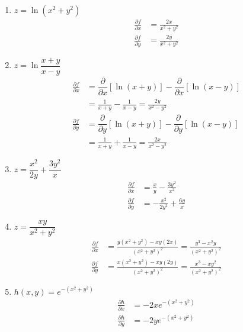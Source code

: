 \begin{enumerate}
    \item $z=\ln \left(x^2+y^2\right)$
          \sol{}
          \begin{align*}
              \frac{\partial f}{\partial x} & = \frac{2x}{x^2+y^2} \\ \frac{\partial f}{\partial y} &= \frac{2y}{x^2+y^2}
          \end{align*}

    \item $z=\ln \dfrac{x+y}{x-y}$
          \sol{}
          \begin{align*}
              \frac{\partial f}{\partial x} & = \dfrac{\partial}{\partial x}[\ln (x + y)] - \dfrac{\partial}{\partial x}[\ln (x - y)] \\  & = \frac{1}{x+y} - \frac{1}{x-y} = \frac{2y}{x^2-y^2}
              \\ \frac{\partial f}{\partial y} & = \dfrac{\partial}{\partial y}[\ln (x + y)] - \dfrac{\partial}{\partial y}[\ln (x - y)] \\ & = \frac{1}{x+y} + \frac{1}{x-y} = \frac{2x}{x^2-y^2}
          \end{align*}
    \item $z=\dfrac{x^2}{2 y}+\dfrac{3 y^2}{x}$
          \sol{}
          \begin{align*}
              \frac{\partial f}{\partial x} & = \frac{x}{y} - \frac{3y^2}{x^2} \\ \frac{\partial f}{\partial y} &= -\frac{x^2}{2y^2} + \frac{6y}{x}
          \end{align*}
    \item $z=\dfrac{x y}{x^2+y^2}$
          \sol{}
          \begin{align*}
              \frac{\partial f}{\partial x} & = \frac{y(x^2+y^2) - xy(2x)}{(x^2+y^2)^2} = \frac{y^3 -
              x^2y}{(x^2+y^2)^2}                                                                      \\ \frac{\partial f}{\partial y} & = \frac{x(x^2+y^2) - xy(2y)}{(x^2+y^2)^2} = \frac{x^3 -
                     xy^2}{(x^2+y^2)^2}
          \end{align*}

          \newpage
    \item $h(x, y)=e^{-\left(x^2+y^2\right)}$
          \sol{}
          \begin{align*}
              \frac{\partial h}{\partial x} & = -2xe^{-\left(x^2+y^2\right)} \\ \frac{\partial h}{\partial y} &= -2ye^{-\left(x^2+y^2\right)}
          \end{align*}


\end{enumerate}
